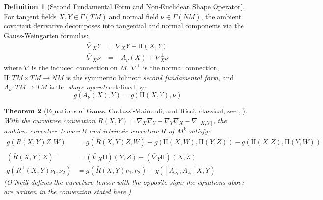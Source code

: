 \documentclass[11pt,reqno]{amsart}
\newtheorem{theorem}{Theorem}[section]
\theoremstyle{definition}
\newtheorem{definition}[theorem]{Definition}
\providecommand{\II}{\mathrm{I\!I}}
\numberwithin{equation}{section}
\providecommand{\II}{\mathrm{II}}
\begin{document}
\begin{definition}[Second Fundamental Form and Non-Euclidean Shape Operator]
For tangent fields $X, Y \in \Gamma(TM)$ and normal field $\nu \in \Gamma(NM)$, the ambient covariant derivative decomposes into tangential and normal components via the Gauss-Weingarten formulas:
\begin{align}
\bar{\nabla}_X Y &= \nabla_X Y + \II(X, Y) \\
\bar{\nabla}_X \nu &= -A_\nu(X) + \nabla^\perp_X \nu
\end{align}
where $\nabla$ is the induced connection on $M$, $\nabla^\perp$ is the normal connection, $\II: TM \times TM \to NM$ is the symmetric bilinear \emph{second fundamental form}, and $A_\nu: TM \to TM$ is the \emph{shape operator} defined by:
\begin{equation}
g(A_\nu(X), Y) = g(\II(X, Y), \nu)
\end{equation}
\end{definition}

\begin{theorem}[Equations of Gauss, Codazzi-Mainardi, and Ricci; classical, see {\cite[Ch.~4]{oneill1983}}, {\cite[Ch.~2--3]{gourgoulhon2012}}]
\label{thm:gauss_codazzi_ricci}
With the curvature convention $R(X,Y) = \nabla_X\nabla_Y - \nabla_Y\nabla_X - \nabla_{[X,Y]}$, the ambient curvature tensor $\bar{R}$ and intrinsic curvature $R$ of $M^k$ satisfy:
\begin{align}
\label{eq:gauss}
g(R(X,Y)Z, W) &= g(\bar{R}(X,Y)Z, W) + g(\II(X,W), \II(Y,Z)) - g(\II(X,Z), \II(Y,W)) \\
\label{eq:codazzi}
(\bar{R}(X,Y)Z)^\perp &= (\bar{\nabla}_X \II)(Y,Z) - (\bar{\nabla}_Y \II)(X,Z) \\
\label{eq:ricci}
g(R^\perp(X,Y)\nu_1, \nu_2) &= g(\bar{R}(X,Y)\nu_1, \nu_2) + g([A_{\nu_1}, A_{\nu_2}]X, Y)
\end{align}
(O'Neill \cite{oneill1983} defines the curvature tensor with the opposite sign; the equations above are written in the convention stated here.)
\end{theorem}
\end{document}
